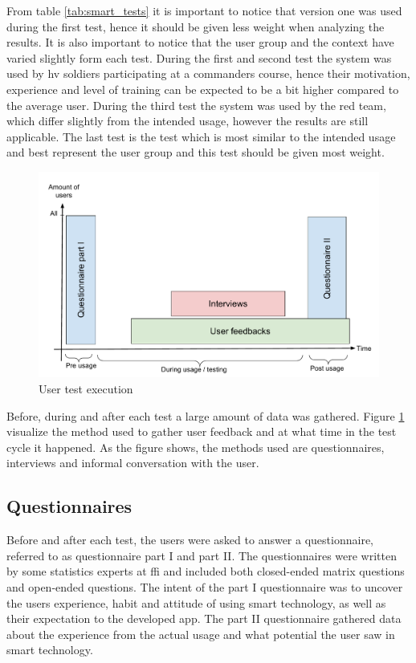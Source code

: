 From table \ref{tab:smart_tests} it is important to notice that version one was used during the first test, hence it should be given less weight when analyzing the results. It is also important to notice that the user group and the context have varied slightly form each test. During the first and second test the system was used by \gls{hv} soldiers participating at a commanders course, hence their motivation, experience and level of training can be expected to be a bit higher compared to the average user. During the third test the system was used by the red team, which differ slightly from the intended usage, however the results are still applicable. The last test is the test which is most similar to the intended usage and best represent the user group and this test should be given most weight.  

\begin{figure}
\label{fig:user_test_timeline}
\centering
\includegraphics[width=1\columnwidth]{content/img/tests_timeline.pdf}
\caption{User test execution}
\end{figure}
Before, during and after each test a large amount of data was gathered. Figure \ref{fig:user_test_timeline} visualize the method used to gather user feedback and at what time in the test cycle it happened. As the figure shows, the methods used are questionnaires, interviews and informal conversation with the user. 



\subsection{Questionnaires}
Before and after each test, the users were asked to answer a questionnaire, referred to as questionnaire part I and part II. The questionnaires were written by some statistics experts at \gls{ffi} and included both closed-ended matrix questions and open-ended questions. The intent of the part I questionnaire was to uncover the users experience, habit and attitude of using smart technology, as well as their expectation to the developed app. The part II questionnaire gathered data about the experience from the actual usage and what potential the user saw in smart technology. 

